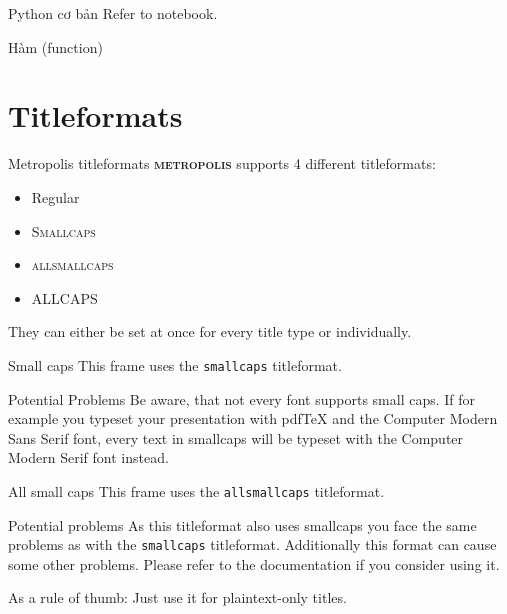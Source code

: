 \documentclass[10pt]{beamer}
\newcommand{\themename}{\textbf{\textsc{metropolis}}\xspace}
\begin{document}
\begin{frame}[fragile]{Python cơ bản}
  Refer to notebook.
\end{frame}

\begin{frame}[fragile]{Hàm (function)}

\end{frame}

\section{Titleformats}

\begin{frame}{Metropolis titleformats}
  \themename supports 4 different titleformats:
  \begin{itemize}
    \item Regular
    \item \textsc{Smallcaps}
    \item \textsc{allsmallcaps}
    \item ALLCAPS
  \end{itemize}
  They can either be set at once for every title type or individually.
\end{frame}

{
\begin{frame}{Small caps}
  This frame uses the \texttt{smallcaps} titleformat.

  \begin{alertblock}{Potential Problems}
    Be aware, that not every font supports small caps. If for example you typeset your presentation with pdfTeX and the Computer Modern Sans Serif font, every text in smallcaps will be typeset with the Computer Modern Serif font instead.
  \end{alertblock}
\end{frame}
}

{
\begin{frame}{All small caps}
  This frame uses the \texttt{allsmallcaps} titleformat.

  \begin{alertblock}{Potential problems}
    As this titleformat also uses smallcaps you face the same problems as with the \texttt{smallcaps} titleformat. Additionally this format can cause some other problems. Please refer to the documentation if you consider using it.

    As a rule of thumb: Just use it for plaintext-only titles.
  \end{alertblock}
\end{frame}
}
\end{document}
